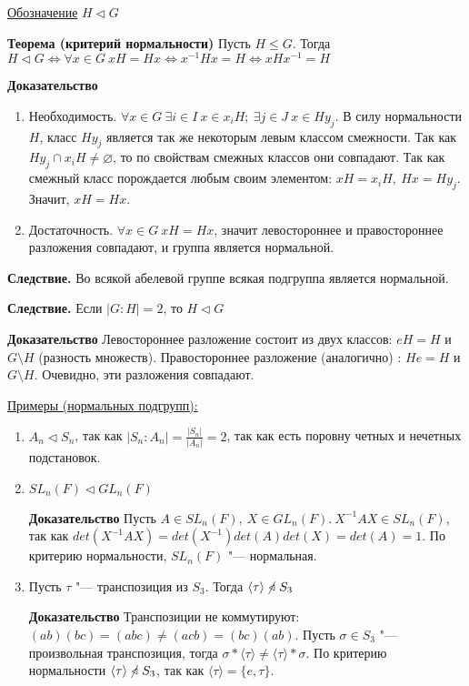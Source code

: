\documentclass{article}
\begin{document}
\underline{Обозначение} $H \triangleleft G$

\vspace{10pt}

\textbf{Теорема (критерий нормальности)}
Пусть $H \leq G$. Тогда $H \triangleleft G \Leftrightarrow \forall x \in G \  xH = Hx \Leftrightarrow x^{-1}Hx = H \Leftrightarrow xHx^{-1} = H$

\textbf{Доказательство}
\begin{enumerate}
	\item Необходимость. $\forall x \in G \  \exists i \in I \  x \in x_iH; \  \exists j \in J \  x \in Hy_j$. В силу нормальности $H$, класс $Hy_j$ является так же некоторым левым классом смежности. Так как $Hy_j \cap x_iH \neq \varnothing$, то по свойствам смежных классов они совпадают. Так как смежный класс порождается любым своим элементом: $xH = x_iH, \  Hx = Hy_j$. Значит, $xH = Hx$.
	\item Достаточность. $\forall x \in G \  xH = Hx$, значит левостороннее и правостороннее разложения совпадают, и группа является нормальной.
\end{enumerate}

\vspace{10pt}

\textbf{Следствие.} Во всякой абелевой группе всякая подгруппа является нормальной.

\vspace{10pt}

\textbf{Следствие.} Если $|G:H| = 2$, то $H \triangleleft G$

\textbf{Доказательство}
Левостороннее разложение состоит из двух классов: $eH = H$ и $G \setminus H$ (разность множеств).
Правостороннее разложение (аналогично) : $He = H$ и $G \setminus H$.
Очевидно, эти разложения совпадают.

\vspace{10pt}

\underline{Примеры (нормальных подгрупп):}
\begin{enumerate}
	\item $A_n \triangleleft S_n$, так как $|S_n:A_n| = \frac{|S_n|}{|A_n|} = 2$, так как есть поровну четных и нечетных подстановок.
	\item $SL_n(F) \triangleleft GL_n(F)$
	
	\textbf{Доказательство}
	Пусть $A \in SL_n(F), \  X \in GL_n(F). \  X^{-1}AX \in SL_n(F)$, так как $det(X^{-1}AX) = det(X^{-1})det(A)det(X) = det(A) = 1$. По критерию нормальности, $SL_n(F)$ "--- нормальная.
	\item Пусть $\tau$ "--- транспозиция из $S_3$. Тогда $\langle \tau \rangle \  \cancel\triangleleft \  S_3$
	
	\textbf{Доказательство}
	Транспозиции не коммутируют: $(a b)(b c) = (a b c) \neq (a c b) = (b c)(a b)$. Пусть $\sigma \in S_3$ "--- произвольная транспозиция, тогда $\sigma*\langle \tau \rangle \neq \langle \tau \rangle*\sigma$.  По критерию нормальности $\langle \tau \rangle \ \cancel  \triangleleft \  S_3$, так как $\langle \tau \rangle = \{e, \tau \}$.
\end{enumerate}
\end{document}
